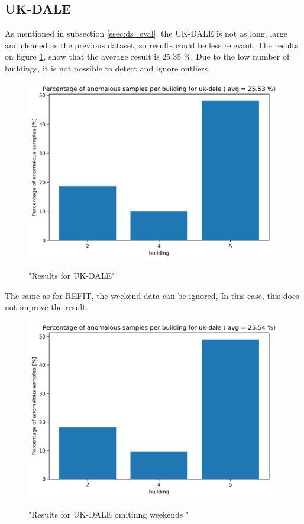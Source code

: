 \subsection{UK-DALE}

As mentioned in subsection \ref{ssec:ds_eval}, the UK-DALE is not as long, large and cleaned as the previous dataset, so results could be less relevant.
The results on figure \ref{fig:ukdale_res}, show that the average result is 25.35 \%. Due to the low number of buildings, it is not possible to detect and ignore outliers.

\begin{figure}[H]
	\centering
	\caption{"Results for UK-DALE"}
	\includegraphics[width=.7\textwidth]{Figures/EC/ukdale_res.png}
	\label{fig:ukdale_res}
\end{figure}

The same as for REFIT, the weekend data can be ignored,
In this case, this does not improve the result. 

\begin{figure}[H]
	\centering
	\caption{"Results for UK-DALE omitinng weekends  "}
	\includegraphics[width=.7\textwidth]{Figures/EC/ukdale_nw_res.png}
	\label{fig:ukdale_res_nw}
\end{figure}

